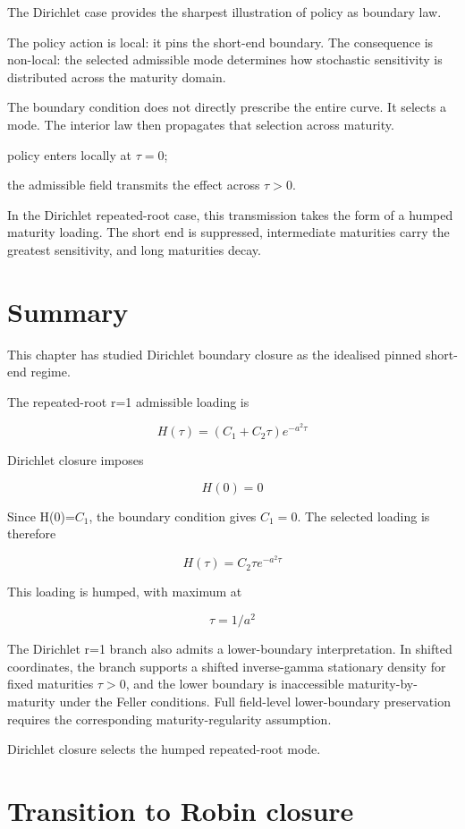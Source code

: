 \documentclass[11pt,oneside]{book}
\begin{document}
The Dirichlet case provides the sharpest illustration of policy as
boundary law.

The policy action is local: it pins the short-end boundary. The
consequence is non-local: the selected admissible mode determines how
stochastic sensitivity is distributed across the maturity domain.

The boundary condition does not directly prescribe the entire curve. It
selects a mode. The interior law then propagates that selection across
maturity.

policy enters locally at $\tau=0$;

the admissible field transmits the effect across $\tau>0$.

In the Dirichlet repeated-root case, this transmission takes the form of
a humped maturity loading. The short end is suppressed, intermediate
maturities carry the greatest sensitivity, and long maturities decay.

\section{Summary}\label{summary-4}

This chapter has studied Dirichlet boundary closure as the idealised
pinned short-end regime.

The repeated-root r=1 admissible loading is

\[
H(\tau)=(C_1+C_2\tau)e^{-a^2\tau}
\]

Dirichlet closure imposes

\[
H(0)=0
\]

Since H(0)=$C_1$, the boundary condition gives $C_1=0$. The selected
loading is therefore

\[
H(\tau)=C_2\tau e^{-a^2\tau}
\]

This loading is humped, with maximum at

\[
\tau=1/a^2
\]

The Dirichlet r=1 branch also admits a lower-boundary interpretation. In
shifted coordinates, the branch supports a shifted inverse-gamma
stationary density for fixed maturities $\tau>0$, and the lower
boundary is inaccessible maturity-by-maturity under the Feller
conditions. Full field-level lower-boundary preservation requires the
corresponding maturity-regularity assumption.

Dirichlet closure selects the humped repeated-root mode.

\section{Transition to Robin
closure}\label{transition-to-robin-closure}
\end{document}
